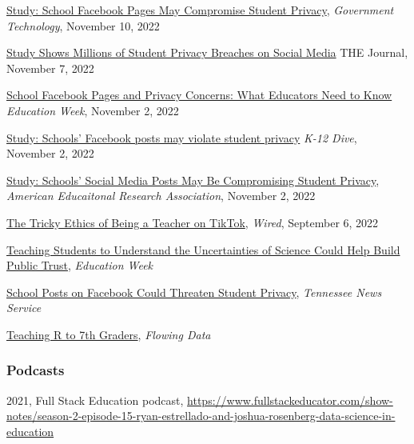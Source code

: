 \documentclass[
  14,
]{article}
\begin{document}
\href{https://www.govtech.com/education/k-12/study-school-facebook-pages-may-compromise-student-privacy}{Study:
School Facebook Pages May Compromise Student Privacy}, \emph{Government
Technology}, November 10, 2022

\href{https://thejournal.com/articles/2022/11/07/study-shows-millions-of-student-privacy-breaches-on-social-media.aspx}{Study
Shows Millions of Student Privacy Breaches on Social Media} THE Journal,
November 7, 2022

\href{https://www.edweek.org/technology/school-facebook-pages-and-privacy-concerns-what-educators-need-to-know/2022/11}{School
Facebook Pages and Privacy Concerns: What Educators Need to Know}
\emph{Education Week}, November 2, 2022

\href{https://www.k12dive.com/news/facebook-posts-may-violate-student-privacy/635525/\#:~:text=Dive\%20Brief\%3A,the\%20American\%20Educational\%20Research\%20Association.}{Study:
Schools' Facebook posts may violate student privacy} \emph{K-12 Dive},
November 2, 2022

\href{https://www.aera.net/Newsroom/Study-Schools-Social-Media-Posts-May-Be-Compromising-Student-Privacy}{Study:
Schools' Social Media Posts May Be Compromising Student Privacy},
\emph{American Educaitonal Research Association}, November 2, 2022

\href{https://www.wired.com/story/teachers-on-tiktok/}{The Tricky Ethics
of Being a Teacher on TikTok}, \emph{Wired}, September 6, 2022

\href{https://www.edweek.org/teaching-learning/teaching-students-to-understand-the-uncertainties-of-science-could-help-build-public-trust/2022/07}{Teaching
Students to Understand the Uncertainties of Science Could Help Build
Public Trust}, \emph{Education Week}

\href{https://www.publicnewsservice.org/cuts/75/rss-75345-1.mp3}{School
Posts on Facebook Could Threaten Student Privacy}, \emph{Tennessee News
Service}

\href{https://flowingdata.com/2019/11/26/teaching-r-to-7th-graders/}{Teaching
R to 7th Graders}, \emph{Flowing Data}

\hypertarget{podcasts}{%
\subsubsection{Podcasts}\label{podcasts}}

2021, Full Stack Education podcast,
\url{https://www.fullstackeducator.com/show-notes/season-2-episode-15-ryan-estrellado-and-joshua-rosenberg-data-science-in-education}
\end{document}
